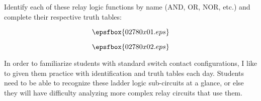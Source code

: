 

Identify each of these relay logic functions by name (AND, OR, NOR, etc.) and complete their respective truth tables:

$$\epsfbox{02780x01.eps}$$







$$\epsfbox{02780x02.eps}$$







In order to familiarize students with standard switch contact configurations, I like to given them practice with identification and truth tables each day.  Students need to be able to recognize these ladder logic sub-circuits at a glance, or else they will have difficulty analyzing more complex relay circuits that use them.





